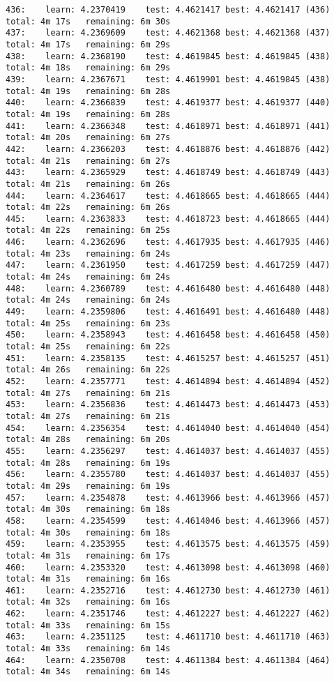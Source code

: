 \documentclass[11pt]{article}
\begin{document}
\begin{Verbatim}[commandchars=\\\{\}]
436:	learn: 4.2370419	test: 4.4621417	best: 4.4621417 (436)	total: 4m 17s	remaining: 6m 30s
437:	learn: 4.2369609	test: 4.4621368	best: 4.4621368 (437)	total: 4m 17s	remaining: 6m 29s
438:	learn: 4.2368190	test: 4.4619845	best: 4.4619845 (438)	total: 4m 18s	remaining: 6m 29s
439:	learn: 4.2367671	test: 4.4619901	best: 4.4619845 (438)	total: 4m 19s	remaining: 6m 28s
440:	learn: 4.2366839	test: 4.4619377	best: 4.4619377 (440)	total: 4m 19s	remaining: 6m 28s
441:	learn: 4.2366348	test: 4.4618971	best: 4.4618971 (441)	total: 4m 20s	remaining: 6m 27s
442:	learn: 4.2366203	test: 4.4618876	best: 4.4618876 (442)	total: 4m 21s	remaining: 6m 27s
443:	learn: 4.2365929	test: 4.4618749	best: 4.4618749 (443)	total: 4m 21s	remaining: 6m 26s
444:	learn: 4.2364617	test: 4.4618665	best: 4.4618665 (444)	total: 4m 22s	remaining: 6m 26s
445:	learn: 4.2363833	test: 4.4618723	best: 4.4618665 (444)	total: 4m 22s	remaining: 6m 25s
446:	learn: 4.2362696	test: 4.4617935	best: 4.4617935 (446)	total: 4m 23s	remaining: 6m 24s
447:	learn: 4.2361950	test: 4.4617259	best: 4.4617259 (447)	total: 4m 24s	remaining: 6m 24s
448:	learn: 4.2360789	test: 4.4616480	best: 4.4616480 (448)	total: 4m 24s	remaining: 6m 24s
449:	learn: 4.2359806	test: 4.4616491	best: 4.4616480 (448)	total: 4m 25s	remaining: 6m 23s
450:	learn: 4.2358943	test: 4.4616458	best: 4.4616458 (450)	total: 4m 25s	remaining: 6m 22s
451:	learn: 4.2358135	test: 4.4615257	best: 4.4615257 (451)	total: 4m 26s	remaining: 6m 22s
452:	learn: 4.2357771	test: 4.4614894	best: 4.4614894 (452)	total: 4m 27s	remaining: 6m 21s
453:	learn: 4.2356836	test: 4.4614473	best: 4.4614473 (453)	total: 4m 27s	remaining: 6m 21s
454:	learn: 4.2356354	test: 4.4614040	best: 4.4614040 (454)	total: 4m 28s	remaining: 6m 20s
455:	learn: 4.2356297	test: 4.4614037	best: 4.4614037 (455)	total: 4m 28s	remaining: 6m 19s
456:	learn: 4.2355780	test: 4.4614037	best: 4.4614037 (455)	total: 4m 29s	remaining: 6m 19s
457:	learn: 4.2354878	test: 4.4613966	best: 4.4613966 (457)	total: 4m 30s	remaining: 6m 18s
458:	learn: 4.2354599	test: 4.4614046	best: 4.4613966 (457)	total: 4m 30s	remaining: 6m 18s
459:	learn: 4.2353955	test: 4.4613575	best: 4.4613575 (459)	total: 4m 31s	remaining: 6m 17s
460:	learn: 4.2353320	test: 4.4613098	best: 4.4613098 (460)	total: 4m 31s	remaining: 6m 16s
461:	learn: 4.2352716	test: 4.4612730	best: 4.4612730 (461)	total: 4m 32s	remaining: 6m 16s
462:	learn: 4.2351746	test: 4.4612227	best: 4.4612227 (462)	total: 4m 33s	remaining: 6m 15s
463:	learn: 4.2351125	test: 4.4611710	best: 4.4611710 (463)	total: 4m 33s	remaining: 6m 14s
464:	learn: 4.2350708	test: 4.4611384	best: 4.4611384 (464)	total: 4m 34s	remaining: 6m 14s

\end{Verbatim}
\end{document}
